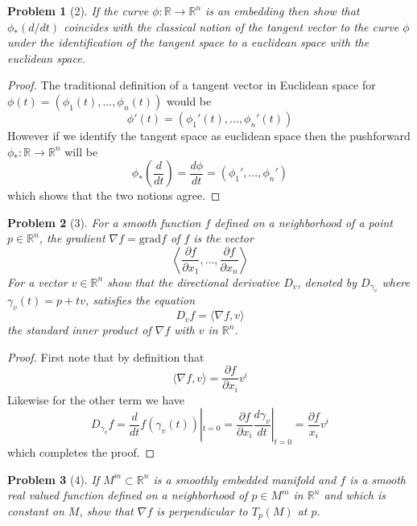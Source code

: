 \documentclass[10pt]{article}
\newcommand{\sk}{\vskip 10mm}
\newcommand{\bb}[1]{\mathbb{#1}}
\theoremstyle{plain}
\newtheorem{problem}{Problem}
\theoremstyle{remark}
\begin{document}
\begin{problem}[2]
  If the curve $\phi:\bb{R}\rightarrow\bb{R}^n$ is an embedding then show that
  $\phi_*(d/dt)$ coincides with the classical notion of the tangent
  vector to the curve $\phi$ under the identification of the tangent
  space to a euclidean space with the euclidean space.
\end{problem}

\begin{proof}
  The traditional definition of a tangent vector in Euclidean space
  for $\phi(t)=(\phi_1(t),\ldots,\phi_n(t))$ would be
  \[
    \phi'(t)=(\phi_1'(t),\ldots,\phi_n'(t))
  \]
  However if we identify the tangent space as euclidean space
  then the pushforward $\phi_*:\bb{R}\rightarrow\bb{R}^n$ will be
  \[
    \phi_*\left(\frac{d}{dt}\right)=\frac{d\phi}{dt}=(\phi_1',\ldots,\phi_n')
  \]
  which shows that the two notions agree.
\end{proof}

\sk

\begin{problem}[3]
  For a smooth function $f$ defined on a neighborhood of a point
  $p\in \bb{R}^n$, the gradient $\nabla f=\mathrm{grad}f$ of $f$ is the vector
  \[
    \left\langle
      \frac{\partial f}{\partial x_1},\ldots,\frac{\partial f}{\partial x_n}
    \right\rangle
  \]
  For a vector $v\in\bb{R}^n$ show that the directional derivative $D_v$,
  denoted by $D_{\gamma_v}$ where $\gamma_v(t)=p+tv$, satisfies the equation
  \[
    D_vf =\langle \nabla f,v\rangle
  \]
  the standard inner product of $\nabla f$ with $v$ in $\bb{R}^n$.
\end{problem}

\begin{proof}
  First note that by definition that
  \[
    \langle \nabla f,v\rangle=\frac{\partial f}{\partial x_i}v^i
  \]
  Likewise for the other term we have
  \[
    D_{\gamma_v}f=\frac{d}{dt}f(\gamma_v(t))|_{t=0}=\frac{\partial f}{\partial x_i}\frac{d\gamma_v}{dt}|_{t=0}=\frac{\partial f}{x_i}v^i
  \]
  which completes the proof.
\end{proof}

\sk

\begin{problem}[4]
  If $M^m\subset\bb{R}^n$ is a smoothly embedded manifold and $f$
  is a smooth real valued function defined on a neighborhood of
  $p\in M^m$ in $\bb{R}^n$ and which is constant on $M$, show that $\nabla f$
  is perpendicular to $T_p(M)$ at $p$.
\end{problem}
\end{document}
